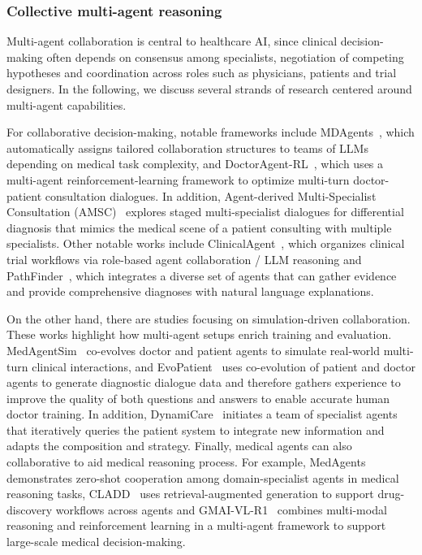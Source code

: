 \subsubsection{Collective multi-agent reasoning}
\label{sec:app-healthcare-multi}


Multi-agent collaboration is central to healthcare AI, since clinical decision-making often depends on consensus among specialists, negotiation of competing hypotheses and coordination across roles such as physicians, patients and trial designers. In the following, we discuss several strands of research centered around multi-agent capabilities.



For collaborative decision-making, notable frameworks include MDAgents~\cite{kim2024mdagents}, which automatically assigns tailored collaboration structures to teams of LLMs depending on medical task complexity, and DoctorAgent-RL~\cite{feng2025doctoragentrlmultiagentcollaborativereinforcement}, which uses a multi-agent reinforcement-learning framework to optimize multi-turn doctor-patient consultation dialogues. In addition, Agent-derived Multi-Specialist Consultation (AMSC)~\cite{wang2024directdiagnosisllmbasedmultispecialist} explores staged multi-specialist dialogues for differential diagnosis that mimics the medical scene of a patient consulting with multiple specialists. Other notable works include ClinicalAgent~\cite{yue2024clinicalagentclinicaltrialmultiagent}, which organizes clinical trial workflows via role-based agent collaboration / LLM reasoning and PathFinder~\cite{ghezloo2025pathfinder}, which integrates a diverse set of agents that can gather evidence and provide comprehensive diagnoses with natural language explanations. 

On the other hand, there are studies focusing on simulation-driven collaboration. These works highlight how multi-agent setups enrich training and evaluation. MedAgentSim~\cite{almansoori2025selfevolvingmultiagentsimulationsrealistic} co-evolves doctor and patient agents to simulate real-world multi-turn clinical interactions, and EvoPatient~\cite{du2025llmssimulatestandardizedpatients} uses co-evolution of patient and doctor agents to generate diagnostic dialogue data and therefore gathers experience to improve the quality of both questions and answers to enable accurate human doctor training. In addition, DynamiCare~\cite{shang2025dynamicaredynamicmultiagentframework} initiates a team of specialist agents that iteratively queries the patient system to integrate new information and adapts the composition and strategy. Finally, medical agents can also collaborative to aid medical reasoning process. For example, MedAgents~\cite{xiangru2023medagents} demonstrates zero-shot cooperation among domain-specialist agents in medical reasoning tasks, CLADD~\cite{lee2025ragenhancedcollaborativellmagents} uses retrieval-augmented generation to support drug-discovery workflows across agents and GMAI-VL-R1~\cite{su2025gmaivlr1harnessingreinforcementlearning} combines multi-modal reasoning and reinforcement learning in a multi-agent framework to support large-scale medical decision-making.



